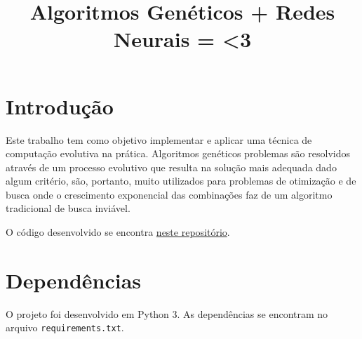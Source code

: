 \documentclass[twoside,conference,a4paper]{IEEEtran}
\begin{document}
\renewcommand{\IEEEkeywordsname}{Palavras-chave}


\title{Algoritmos Genéticos + Redes Neurais = <3}
\author{%
}


\maketitle


\section{Introdução}

Este trabalho tem como objetivo implementar e aplicar uma técnica de computação evolutiva na prática.
Algoritmos genéticos problemas são resolvidos através de um processo evolutivo que resulta na solução mais adequada dado algum critério, são, portanto, muito utilizados para problemas de otimização e de busca onde o crescimento exponencial das combinações faz de um algoritmo tradicional de busca inviável.

O código desenvolvido se encontra \href{https://github.com/jovit/mc906/tree/master/project_2}{neste repositório}\footnotemark.


\section{Dependências}

O projeto foi desenvolvido em Python 3. As dependências se encontram no arquivo \texttt{requirements.txt}.
\end{document}
